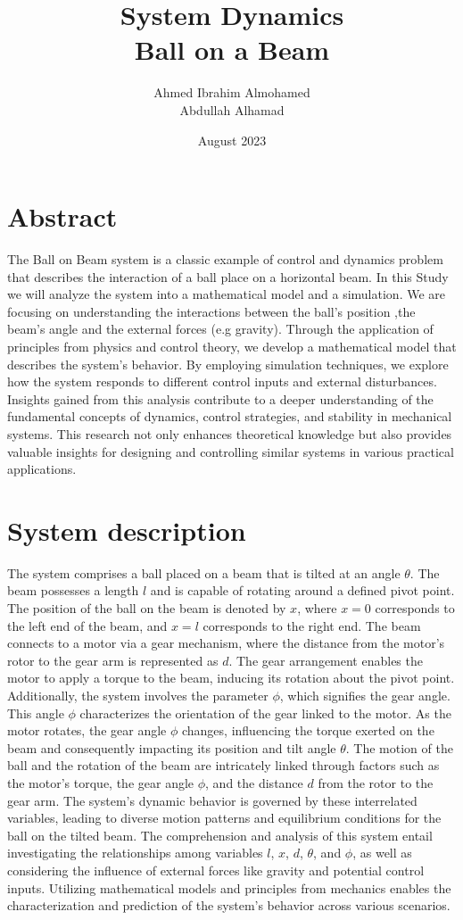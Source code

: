 \documentclass{article}
\title{System Dynamics \\ Ball on a Beam}
\author{Ahmed Ibrahim Almohamed \\ Abdullah Alhamad }
\date{August 2023}
\begin{document}
\maketitle
\section{Abstract}

The Ball on Beam system is a classic example of control and dynamics problem that describes
the interaction of a ball place on a horizontal beam.
In this Study we will analyze the system into a mathematical model and a simulation.
We are focusing on understanding the interactions between the ball's position ,the beam's angle
and the external forces (e.g gravity).
Through the application of principles from physics and control theory,
we develop a mathematical model that describes the system's behavior.
By employing simulation techniques, we explore how the system responds to different control inputs and external disturbances.
Insights gained from this analysis contribute to a deeper understanding of the fundamental concepts of dynamics, control strategies, and stability in mechanical systems.
This research not only enhances theoretical knowledge but also provides valuable insights for designing and controlling similar systems in various practical applications.

\newpage
\section{System description}
The system comprises a ball placed on a beam that is tilted at an angle $\theta$.
The beam possesses a length $l$ and is capable of rotating around a defined pivot point.
The position of the ball on the beam is denoted by $x$, where $x = 0$ corresponds to the left end of the beam,
and $x = l$ corresponds to the right end.
The beam connects to a motor via a gear mechanism, where the distance from the motor's rotor to the gear arm is represented as $d$. The gear arrangement enables the motor to apply a torque to the beam, inducing its rotation about the pivot point.
Additionally, the system involves the parameter $\phi$, which signifies the gear angle.
This angle $\phi$ characterizes the orientation of the gear linked to the motor. As the motor rotates,
the gear angle $\phi$ changes, influencing the torque exerted on the beam and consequently impacting its position and tilt angle $\theta$.
The motion of the ball and the rotation of the beam are intricately linked through factors such as the motor's torque,
the gear angle $\phi$, and the distance $d$ from the rotor to the gear arm.
The system's dynamic behavior is governed by these interrelated variables,
leading to diverse motion patterns and equilibrium conditions for the ball on the tilted beam.
The comprehension and analysis of this system entail investigating the relationships among variables $l$, $x$, $d$, $\theta$, and $\phi$, as well as considering the influence of external forces like gravity and potential control inputs.
Utilizing mathematical models and principles from mechanics enables the characterization and prediction of the system's behavior across various scenarios.
\end{document}
